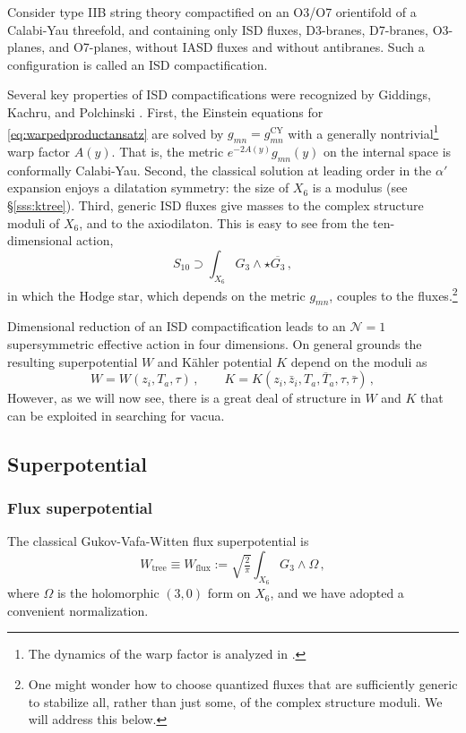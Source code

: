 \documentclass[12pt,a4wide]{article}
\begin{document}
Consider type IIB string theory compactified on an O3/O7 orientifold of a Calabi-Yau threefold, and containing only ISD fluxes, D3-branes, D7-branes, O3-planes, and O7-planes, without IASD fluxes and without antibranes.  Such a configuration is called an ISD compactification. 

Several key properties of ISD compactifications were recognized by Giddings, Kachru, and Polchinski \cite{Giddings:2001yu}.
First, the Einstein equations for \eqref{eq:warpedproductansatz} are solved by $g_{mn}=g_{mn}^{\text{CY}}$ with a generally nontrivial\footnote{
The dynamics of the warp factor is analyzed in \cite{Giddings:2005ff,Douglas:2009zn}.} warp factor $A(y)$.  That is, the metric $e^{-2A(y)}g_{mn}(y)$ on the internal space is conformally Calabi-Yau.  Second, the classical solution at leading order in the $\alpha'$ expansion enjoys a dilatation symmetry: the size of $X_6$ is a modulus (see \S\ref{sss:ktree}).  Third, generic ISD fluxes give masses to the complex structure moduli of $X_6$, and to the axiodilaton.  This is easy to see from the ten-dimensional action,
\begin{equation}
S_{10} \supset \int_{X_6} G_3 \wedge \star \overline{G_3}\,,
\end{equation}
in which the Hodge star, which depends on the metric $g_{mn}$, couples to the fluxes.\footnote{One might wonder how to choose quantized fluxes that are sufficiently generic to stabilize all, rather than just some, of the complex structure moduli.  We will address this below.}

Dimensional reduction of an ISD compactification leads to an
$\mathcal{N}=1$ supersymmetric effective action in four dimensions.  On general grounds the resulting superpotential $W$ and K\"ahler potential $K$ depend on the moduli as
\begin{equation}\label{eq:wandk}
W=W(z_i,T_a,\tau)\,, \qquad K = K(z_i,\bar{z}_i, T_a,\overline{T}_a,\tau,\bar{\tau})\,,
\end{equation} 
However, as we will now see, there is a great deal of structure in $W$ and $K$ that can be exploited in searching for vacua. 

\subsection{Superpotential}\label{sec:sup}

\subsubsection{Flux superpotential}\label{sss:wtree}
The classical Gukov-Vafa-Witten flux superpotential is \cite{Gukov:1999ya}
\begin{equation}\label{eq:gvw}
W_{\text{tree}} \equiv W_{\text{flux}} := \sqrt{\tfrac{2}{\pi}} \int_{X_6} G_3 \wedge \Omega\,,
\end{equation}
where $\Omega$ is the holomorphic $(3,0)$ form on $X_6$, and we have adopted a convenient normalization.  
\end{document}

